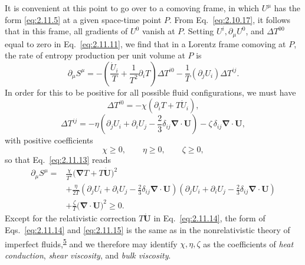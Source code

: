 It is convenient at this point to go over to a comoving frame, in which
\(U^\mu\) has the form \eqref{eq:2.11.5} at a given space-time point \(P\).
From Eq.~\eqref{eq:2.10.17}, it follows that in this frame, all gradients of
\(U^0\) vanish at \(P\). Setting \(U^i,\partial_\mu U^0\), and
\(\Delta T^{00}\) equal to zero in Eq.~\eqref{eq:2.11.11}, we find that in a
Lorentz frame comoving at \(P\), the rate of entropy production per unit volume
at \(P\) is
\begin{equation}
  \partial_\mu S^\mu
  =-\left(\frac{\dot U_i}{T}
    +\frac1{T^2}\partial_iT\right)\Delta T^{i0}
   -\frac1T(\partial_jU_i)\Delta T^{ij}.
  \tag{2.11.13}\label{eq:2.11.13}
\end{equation}
In order for this to be positive for all possible fluid configurations, we must
have
\begin{equation}
  \Delta T^{i0}
  =-\chi\left(\partial_iT+T\dot U_i\right),
  \tag{2.11.14}\label{eq:2.11.14}
\end{equation}
\begin{equation}
  \Delta T^{ij}
  =-\eta\left(
      \partial_jU_i+\partial_iU_j
      -\frac23\delta_{ij}\boldsymbol{\nabla}\cdot\mathbf U
    \right)
   -\zeta\,\delta_{ij}\boldsymbol{\nabla}\cdot\mathbf U ,
  \tag{2.11.15}\label{eq:2.11.15}
\end{equation}
with positive coefficients
\begin{equation}
  \chi\geq0,\qquad\eta\geq0,\qquad\zeta\geq0 ,
  \tag{2.11.16}\label{eq:2.11.16}
\end{equation}
so that Eq.~\eqref{eq:2.11.13} reads
\begin{equation}
\begin{aligned}
  \partial_\mu S^\mu
  ={}&\frac{\chi}{T^2}
      \bigl(\boldsymbol{\nabla}T+T\dot{\mathbf U}\bigr)^2\\
    &+\frac{\eta}{2T}
      \left(
        \partial_jU_i+\partial_iU_j
        -\frac23\delta_{ij}\boldsymbol{\nabla}\cdot\mathbf U
      \right)
      \left(
        \partial_jU_i+\partial_iU_j
        -\frac23\delta_{ij}\boldsymbol{\nabla}\cdot\mathbf U
      \right)\\
    &+\frac{\zeta}{T}
      \bigl(\boldsymbol{\nabla}\cdot\mathbf U\bigr)^2
  \geq0 .
\end{aligned}
  \tag{2.11.17}\label{eq:2.11.17}
\end{equation}
Except for the relativistic correction \(T\dot{\mathbf U}\) in
Eq.~\eqref{eq:2.11.14}, the form of Eqs.~\eqref{eq:2.11.14} and
\eqref{eq:2.11.15} is the same as in the nonrelativistic theory of imperfect
fluids,\textsuperscript{\hyperref[ch2-ref-5]{5}} and we therefore may identify
\(\chi,\eta,\zeta\) as the coefficients of \emph{heat conduction},
\emph{shear viscosity}, and \emph{bulk viscosity}.

